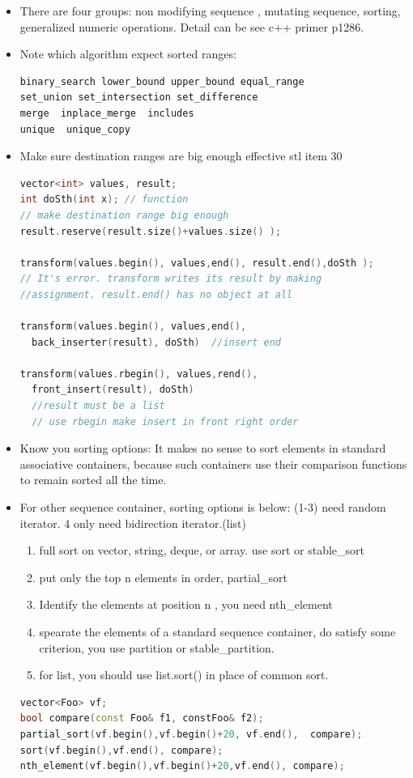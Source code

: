 \documentclass[a4paper,12pt,twoside]{book}
\begin{document}
\begin{itemize}
\item There are four groups: non modifying sequence , mutating sequence, sorting, generalized numeric operations. Detail can be see c++ primer p1286.

\item Note which algorithm expect sorted ranges:
\begin{lstlisting}[frame=single, language=c++]
binary_search lower_bound upper_bound equal_range
set_union set_intersection set_difference
merge  inplace_merge  includes
unique  unique_copy
\end{lstlisting}



\item Make sure destination ranges are big enough effective stl item 30
\begin{lstlisting}[frame=single, language=c++]
vector<int> values, result;
int doSth(int x); // function
// make destination range big enough
result.reserve(result.size()+values.size() );

transform(values.begin(), values,end(), result.end(),doSth );
// It's error. transform writes its result by making
//assignment. result.end() has no object at all

transform(values.begin(), values,end(),
  back_inserter(result), doSth)  //insert end

transform(values.rbegin(), values,rend(),
  front_insert(result), doSth)
  //result must be a list
  // use rbegin make insert in front right order
\end{lstlisting}



\item Know you sorting options: It makes no sense to sort elements in standard associative containers, because such containers use their comparison functions to remain sorted all the time.

\item For other sequence container, sorting options is below: (1-3) need random iterator. 4 only need bidirection iterator.(list)
  \begin{enumerate}
  \item full sort on vector, string, deque, or array.  use sort or stable\_sort
  \item put only the top n elements in order, partial\_sort
  \item Identify the elements at position n , you need nth\_element
  \item spearate the elements of a standard sequence container, do satisfy some criterion, you use partition or stable\_partition.
  \item for list, you should use list.sort() in place of common sort.
  \end{enumerate}
\begin{lstlisting}[frame=single, language=c++]
vector<Foo> vf;
bool compare(const Foo& f1, constFoo& f2);
partial_sort(vf.begin(),vf.begin()+20, vf.end(),  compare);
sort(vf.begin(),vf.end(), compare);
nth_element(vf.begin(),vf.begin()+20,vf.end(), compare);


\end{lstlisting}
\end{itemize}
\end{document}
